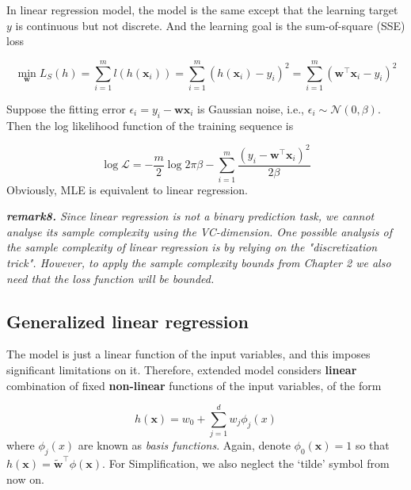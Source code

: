 \documentclass{article}
\begin{document}
	In linear regression model, the model is the same except that the learning target $y$ is continuous but not discrete. And the learning goal is the sum-of-square (SSE) loss

	\begin{equation}
	\min_\mathbf{w} L_S(h) =\sum_{i=1}^m  l(h(\mathbf{x}_i)) = \sum_{i=1}^m (h(\mathbf{x}_i) - y_i)^2 = \sum_{i=1}^m (\mathbf{w}^\top\mathbf{x}_i - y_i)^2 
	\end{equation}

	Suppose the fitting error $\epsilon_i = y_i-\mathbf{wx}_i$ is Gaussian noise, i.e., $\epsilon_i \sim\mathcal{N}(0,\beta)$. Then the log likelihood function of the training sequence is
	
	\begin{equation*}
	\log \mathcal{L} = -\frac{m}{2} \log 2\pi\beta - \sum_{i=1}^m \frac{(y_i-\mathbf{w}^\top\mathbf{x}_i)^2}{2\beta}
	\end{equation*}
Obviously, MLE is equivalent to linear regression.

	\begin{framed}
	\begin{scriptsize}
	\begin{spacing}{1.2}
	\noindent\textit{\textbf{remark8.} Since linear regression is not a binary prediction task, we cannot analyse its sample complexity using the VC-dimension. One possible analysis of the sample complexity of linear regression is by relying on the "discretization trick". However, to apply the sample complexity bounds from Chapter 2 we also need that the loss function will be bounded.}
	\end{spacing}
	\end{scriptsize}
	\end{framed}
	
	\subsection{Generalized linear regression}
	
	The model is just a linear function of the input variables, and this imposes significant limitations on it. Therefore, extended model considers \textbf{linear} combination of fixed \textbf{non-linear} functions of the input variables, of the form
	
	\begin{equation}
	h(\mathbf{x}) = w_0 + \sum_{j=1}^d w_j \phi_j(x)
	\end{equation}
where $\phi_j(x)$ are known as \textit{basis functions}. Again, denote $\phi_0(\mathbf{x})=1$ so that $h(\mathbf{x}) = \tilde{\mathbf{w}}^\top \phi(\mathbf{x})$. For Simplification, we also neglect the `tilde' symbol from now on.
\end{document}
